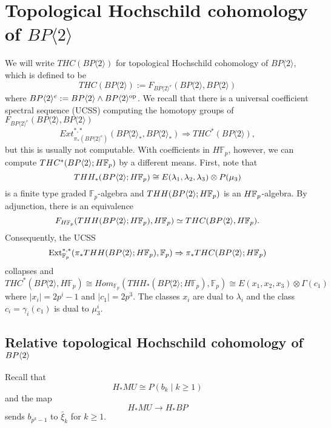 
\section{Topological Hochschild cohomology of $BP\langle 2\rangle$}
We will write $THC(BP\langle 2\rangle)$ for topological Hochschild cohomology of $BP\langle 2\rangle$, which is defined to be
\[ THC(BP\langle 2\rangle) := F_{BP\langle 2\rangle^e} (BP\langle 2\rangle,BP\langle 2\rangle) \]
where $BP\langle 2\rangle^e:=BP\langle 2\rangle\wedge BP\langle 2\rangle^{\mathrm{op}}$. 
We recall that there is a universal coefficient spectral sequence (UCSS) computing the homotopy groups of $F_{BP\langle 2\rangle^e} (BP\langle 2\rangle,BP\langle 2\rangle)$ 
\[ Ext_{ \pi_*(BP\langle 2\rangle^e)}^{*,*} (BP\langle 2\rangle_*,BP\langle 2\rangle_*) \Rightarrow THC^*(BP\langle 2\rangle), \]
but this is usually not computable. With coefficients in $H\mathbb{F}_p$, however, we can compute $THC^*(BP\langle 2 \rangle;H\mathbb{F}_p)$ by a different means. First, note that 
\[ THH_*(BP\langle 2 \rangle; H\mathbb{F}_p)\cong E(\lambda_1,\lambda_2,\lambda_3)\otimes P(\mu_3)\]
 is a finite type graded $\mathbb{F}_p$-algebra and $THH(BP\langle 2\rangle; H\mathbb{F}_p)$ is an $H\mathbb{F}_p$-algebra. By adjunction, there is an equivalence
\[ F_{H\mathbb{F}_p} (THH(BP\langle 2 \rangle ; H\mathbb{F}_p ) , H\mathbb{F}_p ) \simeq THC(BP\langle 2 \rangle , H\mathbb{F}_p). \] 
Consequently, the UCSS 
\[ \operatorname{Ext}_{\mathbb{F}_p}^{*,*}(\pi_*THH(BP\langle 2 \rangle;H\mathbb{F}_p),\mathbb{F}_p) \Rightarrow \pi_*THC(BP\langle 2 \rangle;H\mathbb{F}_p)\]
collapses and 
\begin{equation}\label{THCHFp} THC^*(BP\langle 2 \rangle , H\mathbb{F}_p)\cong Hom_{\mathbb{F}_p}(THH_*(BP\langle 2 \rangle;H\mathbb{F}_p),\mathbb{F}_p) \cong E(x_1,x_2,x_3)\otimes \Gamma(c_1) \end{equation}
where $|x_i|=2p^i-1$ and $|c_1|=2p^3$. The classes $x_i$ are dual to $\lambda_i$ and the class $c_{i}=\gamma_i(c_1)$ is dual to $\mu_3^i$.  

\subsection{Relative topological Hochschild cohomology of $BP\langle 2 \rangle$}
Recall that 
\[ H_*MU\cong P(b_k \mid k\ge 1) \]
and the map 
\[ H_*MU \to  H_*BP \]
sends $b_{p^k-1}$ to $\bar{\xi}_k$ for $k\ge 1$. 

